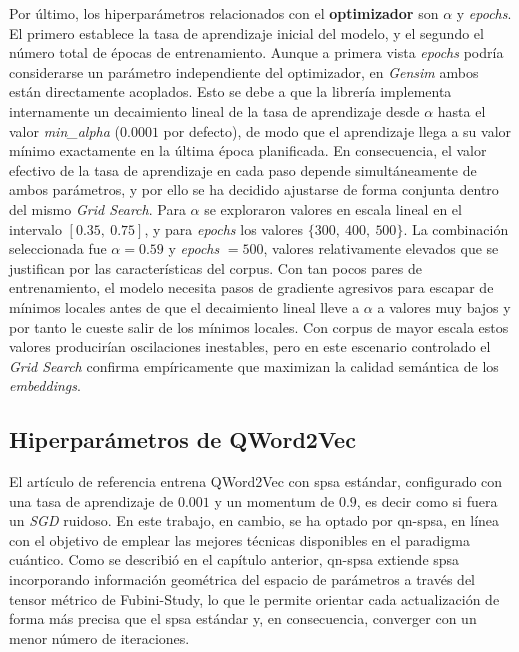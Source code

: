 Por último, los hiperparámetros relacionados con el \textbf{optimizador} son $\alpha$ y \textit{epochs}. El primero establece la tasa de aprendizaje inicial del modelo, y el segundo el número total de épocas de entrenamiento. Aunque a primera vista \textit{epochs} podría considerarse un parámetro independiente del optimizador, en \textit{Gensim} ambos están directamente acoplados. Esto se debe a que la librería implementa internamente un decaimiento lineal de la tasa de aprendizaje desde $\alpha$ hasta el valor \textit{min\_alpha} ($0.0001$ por defecto), de modo que el aprendizaje llega a su valor mínimo exactamente en la última época planificada. En consecuencia, el valor efectivo de la tasa de aprendizaje en cada paso depende simultáneamente de ambos parámetros, y por ello se ha decidido ajustarse de forma conjunta dentro del mismo \textit{Grid Search}. Para $\alpha$ se exploraron valores en escala lineal en el intervalo $[0.35,\ 0.75]$, y para \textit{epochs} los valores $\{300,\ 400,\ 500\}$. La combinación seleccionada fue $\alpha = 0.59$ y \textit{epochs} $= 500$, valores relativamente elevados que se justifican por las características del corpus. Con tan pocos pares de entrenamiento, el modelo necesita pasos de gradiente agresivos para escapar de mínimos locales antes de que el decaimiento lineal lleve a $\alpha$ a valores muy bajos y por tanto le cueste salir de los mínimos locales. Con corpus de mayor escala estos valores producirían oscilaciones inestables, pero en este escenario controlado el \textit{Grid Search} confirma empíricamente que maximizan la calidad semántica de los \textit{embeddings}.


\subsection{Hiperparámetros de QWord2Vec}

El artículo de referencia \cite{ohno_qword2vec_2025} entrena QWord2Vec con \gls{spsa} estándar, configurado con una tasa de aprendizaje de $0.001$ y un momentum de $0.9$, es decir como si fuera un \textit{SGD} ruidoso. En este trabajo, en cambio, se ha optado por \gls{qn-spsa}, en línea con el objetivo de emplear las mejores técnicas disponibles en el paradigma cuántico. Como se describió en el capítulo anterior, \gls{qn-spsa} extiende \gls{spsa} incorporando información geométrica del espacio de parámetros a través del tensor métrico de Fubini-Study, lo que le permite orientar cada actualización de forma más precisa que el \gls{spsa} estándar y, en consecuencia, converger con un menor número de iteraciones.

